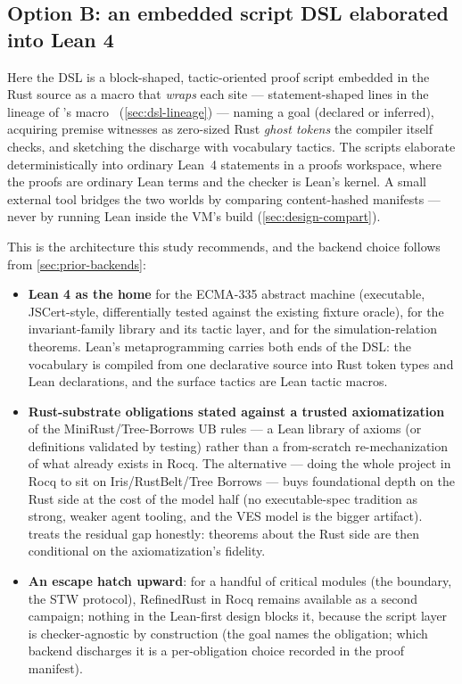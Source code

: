 \subsection{Option B: an embedded script DSL elaborated into Lean 4}
\label{sec:design-embed}

Here the DSL is a block-shaped, tactic-oriented proof script embedded
in the Rust source as a macro that \emph{wraps} each 
site --- statement-shaped lines in the lineage of 's
 macro~\cite{dotnetdll} (\cref{sec:dsl-lineage}) --- naming
a goal (declared or inferred), acquiring premise witnesses as
zero-sized Rust \emph{ghost tokens} the compiler itself checks, and
sketching the discharge with vocabulary tactics. The scripts elaborate
deterministically into ordinary Lean~4 statements in a proofs
workspace, where the proofs are ordinary Lean terms and the checker is
Lean's kernel. A small external tool bridges the two worlds by
comparing content-hashed manifests --- never by running Lean inside the
VM's build (\cref{sec:design-compart}).

This is the architecture this study recommends, and the backend choice
follows from \cref{sec:prior-backends}:

\begin{itemize}[leftmargin=1.4em]
\item \textbf{Lean 4 as the home} for the ECMA-335 abstract machine
  (executable, JSCert-style, differentially tested against the existing
  fixture oracle), for the invariant-family library and its tactic
  layer, and for the simulation-relation theorems. Lean's
  metaprogramming carries both ends of the DSL: the vocabulary is
  compiled from one declarative source into Rust token types and Lean
  declarations, and the surface tactics are Lean tactic macros.
\item \textbf{Rust-substrate obligations stated against a trusted
  axiomatization} of the MiniRust/Tree-Borrows UB rules --- a Lean
  library of axioms (or definitions validated by testing) rather than a
  from-scratch re-mechanization of what already exists in Rocq. The
  alternative --- doing the whole project in Rocq to sit on
  Iris/RustBelt/Tree Borrows --- buys foundational depth on the Rust side
  at the cost of the model half (no executable-spec tradition as strong,
  weaker agent tooling, and the VES model is the bigger artifact).
   treats the residual gap honestly: theorems about the
  Rust side are then conditional on the axiomatization's fidelity.
\item \textbf{An escape hatch upward}: for a handful of critical modules
  (the \gcarena{} boundary, the STW protocol), RefinedRust in Rocq
  remains available as a second campaign; nothing in the Lean-first
  design blocks it, because the script layer is checker-agnostic by
  construction (the goal names the obligation; which backend discharges
  it is a per-obligation choice recorded in the proof manifest).
\end{itemize}


